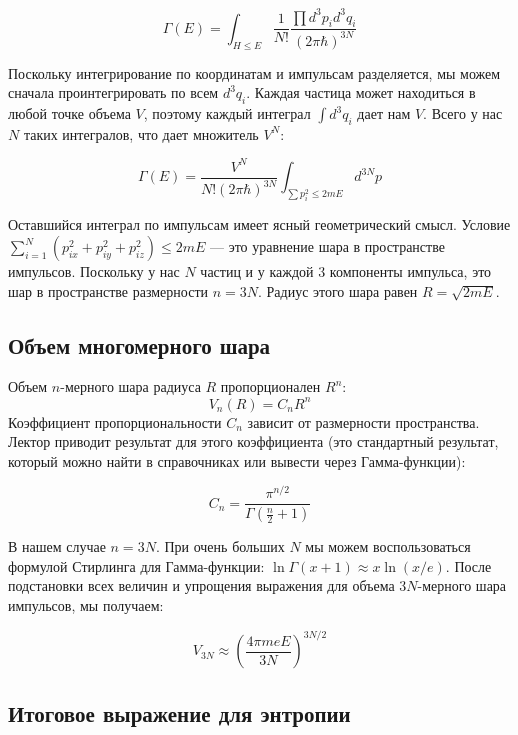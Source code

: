 \documentclass[../general/general]{subfiles}
\begin{document}
\begin{equation}
    \Gamma(E) = \int_{H \le E} \frac{1}{N!} \frac{\prod d^3 p_i d^3 q_i}{(2\pi\hbar)^{3N}}
\end{equation}

Поскольку интегрирование по координатам и импульсам разделяется, мы можем сначала проинтегрировать по всем $d^3 q_i$. Каждая частица может находиться в любой точке объема $V$, поэтому каждый интеграл $\int d^3 q_i$ дает нам $V$. Всего у нас $N$ таких интегралов, что дает множитель $V^N$:

\begin{equation}
    \Gamma(E) = \frac{V^N}{N! (2\pi\hbar)^{3N}} \int_{\sum p_i^2 \le 2mE} d^{3N} p
\end{equation}

Оставшийся интеграл по импульсам имеет ясный геометрический смысл. Условие $\sum_{i=1}^N (p_{ix}^2 + p_{iy}^2 + p_{iz}^2) \le 2mE$ — это уравнение шара в пространстве импульсов. Поскольку у нас $N$ частиц и у каждой 3 компоненты импульса, это шар в пространстве размерности $n = 3N$. Радиус этого шара равен $R = \sqrt{2mE}$.

\subsection{Объем многомерного шара}

Объем $n$-мерного шара радиуса $R$ пропорционален $R^n$:
\begin{equation}
    V_n(R) = C_n R^n
\end{equation}
Коэффициент пропорциональности $C_n$ зависит от размерности пространства. Лектор приводит результат для этого коэффициента (это стандартный результат, который можно найти в справочниках или вывести через Гамма-функции):

\begin{equation}
    C_n = \frac{\pi^{n/2}}{\Gamma(\frac{n}{2} + 1)}
\end{equation}

В нашем случае $n = 3N$. При очень больших $N$ мы можем воспользоваться формулой Стирлинга для Гамма-функции: $\ln \Gamma(x+1) \approx x \ln(x/e)$. После подстановки всех величин и упрощения выражения для объема $3N$-мерного шара импульсов, мы получаем:

\begin{equation}
    V_{3N} \approx \left( \frac{4\pi m e E}{3N} \right)^{3N/2}
\end{equation}


\subsection{Итоговое выражение для энтропии}
\end{document}
